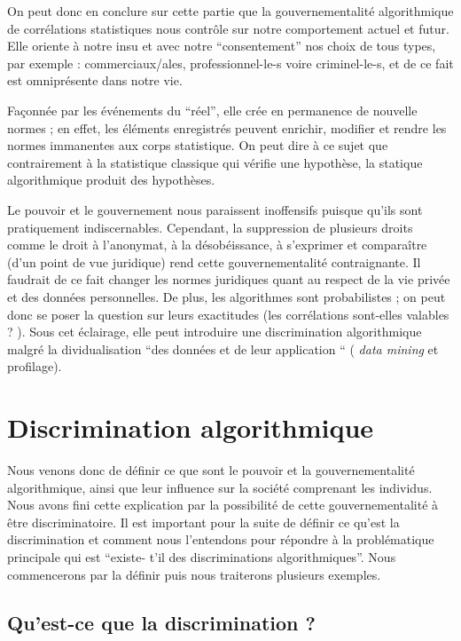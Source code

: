 \documentclass[a4paper,12pt]{report}
\begin{document}
On peut donc en conclure sur cette partie que la gouvernementalité algorithmique de corrélations statistiques nous contrôle sur notre comportement actuel et futur. Elle oriente à notre insu et avec notre ``consentement'' nos choix de tous types, par exemple : commerciaux/ales, professionnel-le-s voire criminel-le-s, et de ce fait est omniprésente dans notre vie.

Façonnée par les événements du ``réel'', elle crée en permanence de nouvelle normes ; en effet, les éléments enregistrés peuvent enrichir, modifier et rendre les normes immanentes aux corps statistique. On peut dire à ce sujet que contrairement à la statistique classique qui vérifie une hypothèse, la statique algorithmique produit des hypothèses.

Le pouvoir et le gouvernement nous paraissent inoffensifs puisque qu'ils sont pratiquement indiscernables. Cependant, la suppression de plusieurs droits comme le droit à l'anonymat, à la désobéissance, à s'exprimer et comparaître (d'un point de vue juridique) rend cette gouvernementalité contraignante. Il faudrait de ce fait changer les normes juridiques quant au respect de la vie privée et des données personnelles. De plus, les algorithmes sont probabilistes ; on peut donc se poser la question sur leurs exactitudes (les corrélations sont-elles valables ? ). Sous cet éclairage, elle peut introduire une discrimination algorithmique malgré la dividualisation ``des données et de leur application `` ( \textit{data mining} et profilage).

\chapter{Discrimination algorithmique}

Nous venons donc de définir ce que sont le pouvoir et la gouvernementalité algorithmique, ainsi que leur influence sur la société comprenant les individus. Nous avons fini cette explication par la possibilité de cette gouvernementalité à être discriminatoire. Il est important pour la suite de définir ce qu'est la discrimination et comment nous l'entendons pour répondre à la problématique principale qui est ``existe- t'il des discriminations algorithmiques''.
Nous commencerons par la définir puis nous traiterons plusieurs exemples.

\section{Qu'est-ce que la discrimination ?}
\end{document}
